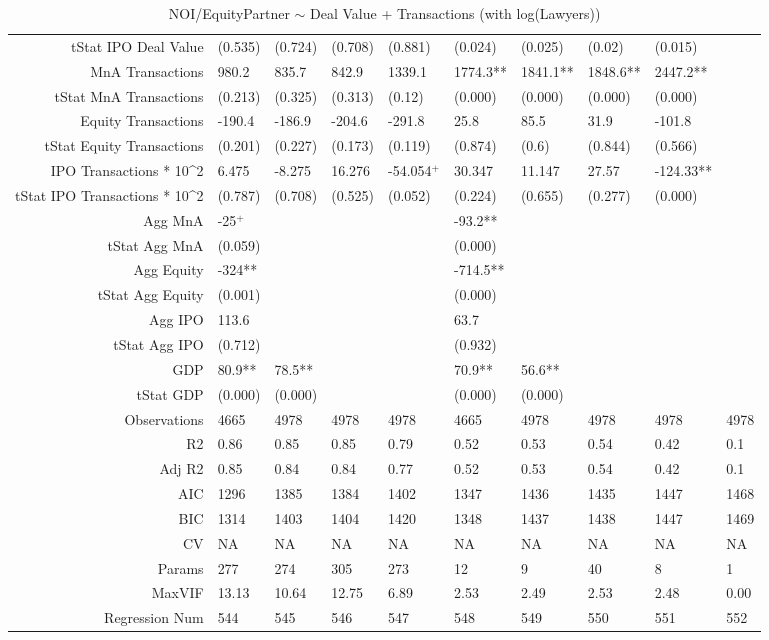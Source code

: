 \begin{table}[ht]
\begin{tabular}{rlllllllll}
  tStat IPO Deal Value & (0.535) & (0.724) & (0.708) & (0.881) & (0.024) & (0.025) & (0.02) & (0.015) &  \\ 
  MnA Transactions & 980.2 & 835.7 & 842.9 & 1339.1 & 1774.3** & 1841.1** & 1848.6** & 2447.2** &  \\ 
  tStat MnA Transactions & (0.213) & (0.325) & (0.313) & (0.12) & (0.000) & (0.000) & (0.000) & (0.000) &  \\ 
  Equity Transactions & -190.4 & -186.9 & -204.6 & -291.8 & 25.8 & 85.5 & 31.9 & -101.8 &  \\ 
  tStat Equity Transactions & (0.201) & (0.227) & (0.173) & (0.119) & (0.874) & (0.6) & (0.844) & (0.566) &  \\ 
  IPO Transactions * 10^2 & 6.475 & -8.275 & 16.276 & -54.054$^{+}$ & 30.347 & 11.147 & 27.57 & -124.33** &  \\ 
  tStat IPO Transactions * 10^2 & (0.787) & (0.708) & (0.525) & (0.052) & (0.224) & (0.655) & (0.277) & (0.000) &  \\ 
  Agg MnA & -25$^{+}$ &  &  &  & -93.2** &  &  &  &  \\ 
  tStat Agg MnA & (0.059) &  &  &  & (0.000) &  &  &  &  \\ 
  Agg Equity & -324** &  &  &  & -714.5** &  &  &  &  \\ 
  tStat Agg Equity & (0.001) &  &  &  & (0.000) &  &  &  &  \\ 
  Agg IPO & 113.6 &  &  &  & 63.7 &  &  &  &  \\ 
  tStat Agg IPO & (0.712) &  &  &  & (0.932) &  &  &  &  \\ 
  GDP & 80.9** & 78.5** &  &  & 70.9** & 56.6** &  &  &  \\ 
  tStat GDP & (0.000) & (0.000) &  &  & (0.000) & (0.000) &  &  &  \\ 
  Observations & 4665 & 4978 & 4978 & 4978 & 4665 & 4978 & 4978 & 4978 & 4978 \\ 
  R2 & 0.86 & 0.85 & 0.85 & 0.79 & 0.52 & 0.53 & 0.54 & 0.42 & 0.1 \\ 
  Adj R2 & 0.85 & 0.84 & 0.84 & 0.77 & 0.52 & 0.53 & 0.54 & 0.42 & 0.1 \\ 
  AIC & 1296 & 1385 & 1384 & 1402 & 1347 & 1436 & 1435 & 1447 & 1468 \\ 
  BIC & 1314 & 1403 & 1404 & 1420 & 1348 & 1437 & 1438 & 1447 & 1469 \\ 
  CV & NA & NA & NA & NA & NA & NA & NA & NA & NA \\ 
  Params & 277 & 274 & 305 & 273 & 12 & 9 & 40 & 8 & 1 \\ 
  MaxVIF & 13.13 & 10.64 & 12.75 & 6.89 & 2.53 & 2.49 & 2.53 & 2.48 & 0.00 \\ 
  Regression Num & 544 & 545 & 546 & 547 & 548 & 549 & 550 & 551 & 552 \\ 
   \hline
\end{tabular}
\caption{NOI/EquityPartner $\sim$ Deal Value + Transactions (with log(Lawyers))} 
\end{table}
